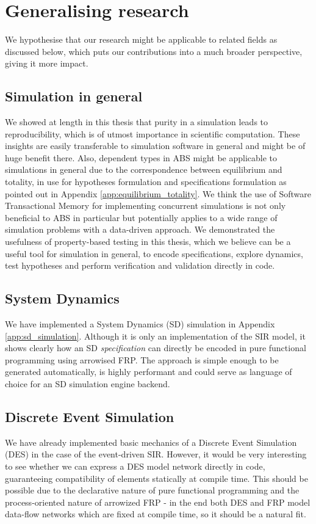 \section{Generalising research}
We hypothesise that our research might be applicable to related fields as discussed below, which puts our contributions into a much broader perspective, giving it more impact.

\subsection{Simulation in general}
We showed at length in this thesis that purity in a simulation leads to reproducibility, which is of utmost importance in scientific computation. These insights are easily transferable to simulation software in general and might be of huge benefit there. Also, dependent types in ABS might be applicable to simulations in general due to the correspondence between equilibrium and totality, in use for hypotheses formulation and specifications formulation as pointed out in Appendix \ref{app:equilibrium_totality}.  We think the use of Software Transactional Memory for implementing concurrent simulations is not only beneficial to ABS in particular but potentially applies to a wide range of simulation problems with a data-driven approach. We demonstrated the usefulness of property-based testing in this thesis, which we believe can be a useful tool for simulation in general, to encode specifications, explore dynamics, test hypotheses and perform verification and validation directly in code.

\subsection{System Dynamics}
We have implemented a System Dynamics (SD) simulation in Appendix \ref{app:sd_simulation}. Although it is only an implementation of the SIR model, it shows clearly how an SD \textit{specification} can directly be encoded in pure functional programming using arrowised FRP. The approach is simple enough to be generated automatically, is highly performant and could serve as language of choice for an SD simulation engine backend.

\subsection{Discrete Event Simulation}
We have already implemented basic mechanics of a Discrete Event Simulation (DES) in the case of the event-driven SIR. However, it would be very interesting to see whether we can express a DES model network directly in code, guaranteeing compatibility of elements statically at compile time. This should be possible due to the declarative nature of pure functional programming and the process-oriented nature of arrowized FRP - in the end both DES and FRP model data-flow networks which are fixed at compile time, so it should be a natural fit.


